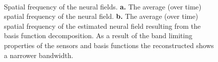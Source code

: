 \documentclass[twocolumn,11pt,a4paper]{article}		%
\begin{document}
\begin{figure}[th]
\centering
{}
\\
\caption{Spatial frequency of the neural fields. \textbf{a.} The average (over time) spatial frequency of the neural field. \textbf{b.} The average (over time) spatial frequency of the estimated neural field resulting from the basis function decomposition. As a result of the band limiting properties of the sensors and basis functions the reconstructed shows a narrower bandwidth.}
\label{fig:FFTTrueEstimate}
\end{figure}
\end{document}

